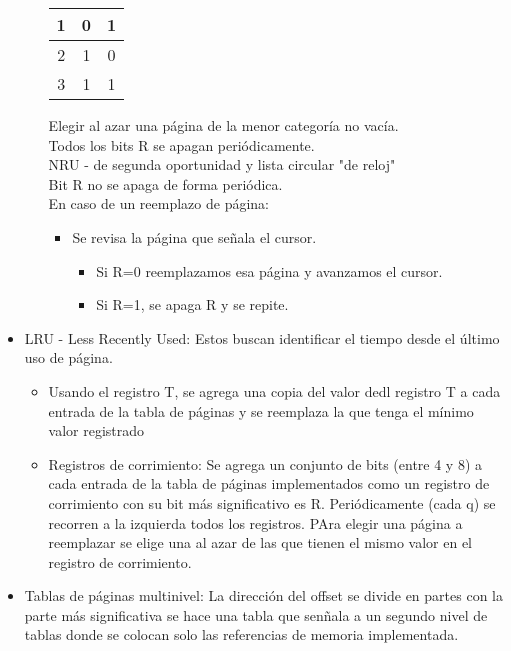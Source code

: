 \begin{itemize}
\begin{itemize}
\begin{center}
\begin{tabular}{| c | c | c |}
					\hline
					1 & 0 & 1 \\
					\hline
					2 & 1 & 0 \\
					\hline
					3 & 1 & 1 \\
					\hline
				\end{tabular}
			\end{center}
			Elegir al azar una p\'{a}gina de la menor categor\'{i}a no vac\'{i}a.\\
			Todos los bits R se apagan peri\'{o}dicamente.\\
			NRU - de segunda oportunidad y lista circular "de reloj"\\
			Bit R no se apaga de forma peri\'{o}dica.\\
			En caso de un reemplazo de p\'{a}gina:\\
			\begin{itemize}
				\item Se revisa la p\'{a}gina que se\~{n}ala el cursor.
				\begin{itemize}
					\item Si R=0 reemplazamos esa p\'{a}gina y avanzamos el cursor.
					\item Si R=1, se apaga R y se repite.
				\end{itemize}
			\end{itemize}
	\end{itemize}
	\item LRU - Less Recently Used: Estos buscan identificar el tiempo desde el \'{u}ltimo uso de p\'{a}gina.
	\begin{itemize}
		\item Usando el registro T, se agrega una copia del valor dedl registro T a cada entrada de la tabla de p\'{a}ginas y se reemplaza la que tenga el m\'{i}nimo valor registrado
		\item Registros de corrimiento: Se agrega un conjunto de bits (entre 4 y 8) a cada entrada de la tabla de p\'{a}ginas implementados como un registro de corrimiento con su bit m\'{a}s significativo es R. Peri\'{o}dicamente (cada q) se recorren a la izquierda todos los registros. PAra elegir una p\'{a}gina a reemplazar se elige una al azar de las que tienen el mismo valor en el registro de corrimiento.
	\end{itemize}
	\item Tablas de p\'{a}ginas multinivel: La direcci\'{o}n del offset se divide en partes con la parte m\'{a}s significativa se hace una tabla que sen\~{n}ala a un segundo nivel de tablas donde se colocan solo las referencias de memoria implementada.
\end{itemize}

